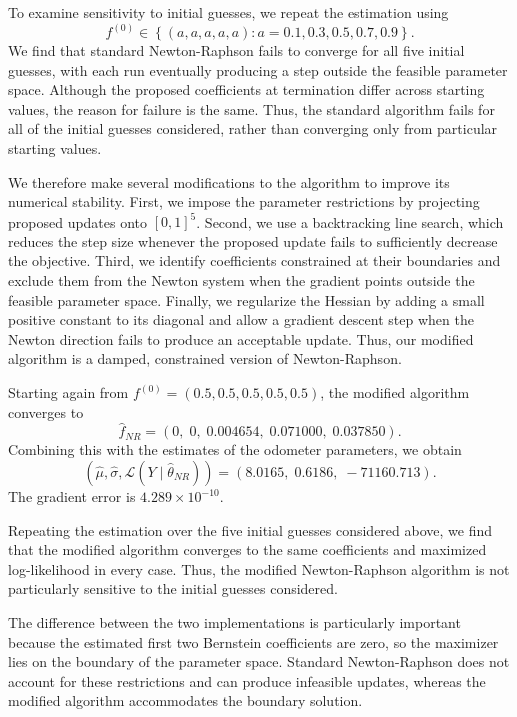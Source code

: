 \documentclass{article}
\begin{document}
\begin{enumerate}
To examine sensitivity to initial guesses, we repeat the
estimation using
\[
    f^{(0)}\in
    \left\{
    (a,a,a,a,a): a=0.1,0.3,0.5,0.7,0.9
    \right\}.
\]
We find that standard Newton-Raphson fails to converge
for all five initial guesses, with each run eventually
producing a step outside the feasible parameter space.
Although the proposed coefficients at termination differ
across starting values, the reason for failure is the same.
Thus, the standard algorithm fails for all of the initial
guesses considered, rather than converging only from
particular starting values.

We therefore make several modifications to the algorithm
to improve its numerical stability. First, we impose the
parameter restrictions by projecting proposed updates
onto $[0,1]^5$. Second, we use a backtracking line search,
which reduces the step size whenever the proposed update
fails to sufficiently decrease the objective. Third, we
identify coefficients constrained at their boundaries and
exclude them from the Newton system when the gradient points
outside the feasible parameter space. Finally, we regularize
the Hessian by adding a small positive constant to its
diagonal and allow a gradient descent step when the Newton
direction fails to produce an acceptable update. Thus, our
modified algorithm is a damped, constrained
version of Newton-Raphson.

Starting again from $f^{(0)}=(0.5,0.5,0.5,0.5,0.5)$,
the modified algorithm converges to
\[
    \hat{f}_{NR}
    = (0,\;0,\;0.004654,\;0.071000,\;0.037850).
\]
Combining this with the estimates of the odometer parameters,
we obtain
\[
    (\hat{\mu},\hat{\sigma},
    \mathcal{L}(Y\mid\hat{\theta}_{NR}))
    = (8.0165,\;0.6186,\;-71160.713).
\]
The gradient error is $4.289\times10^{-10}$.

Repeating the estimation over the five initial guesses
considered above, we find that the modified algorithm
converges to the same coefficients and maximized
log-likelihood in every case. Thus, the modified
Newton-Raphson algorithm is not particularly sensitive
to the initial guesses considered.

The difference between the two implementations is
particularly important because the estimated first two
Bernstein coefficients are zero, so the maximizer lies
on the boundary of the parameter space. Standard
Newton-Raphson does not account for these restrictions
and can produce infeasible updates, whereas the modified
algorithm accommodates the boundary solution.



\end{enumerate}
\end{document}
